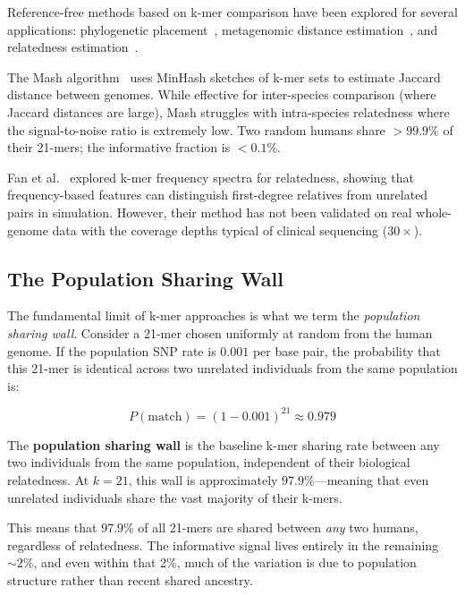 \documentclass{../yalumba}
\begin{document}
Reference-free methods based on k-mer comparison have been explored for
several applications: phylogenetic placement~\cite{brinda2023phylogenetic},
metagenomic distance estimation~\cite{ondov2016mash}, and relatedness
estimation~\cite{fan2021reference}.


The Mash algorithm~\cite{ondov2016mash} uses MinHash sketches of k-mer sets to
estimate Jaccard distance between genomes.  While effective for inter-species
comparison (where Jaccard distances are large), Mash struggles with
intra-species relatedness where the signal-to-noise ratio is extremely low.
Two random humans share $>99.9\%$ of their 21-mers; the informative fraction
is $<0.1\%$.

Fan et al.~\cite{fan2021reference} explored k-mer frequency spectra for
relatedness, showing that frequency-based features can distinguish first-degree
relatives from unrelated pairs in simulation.  However, their method has not
been validated on real whole-genome data with the coverage depths typical of
clinical sequencing ($30\times$).

\subsection{The Population Sharing Wall}
\label{sec:sharing-wall}

The fundamental limit of k-mer approaches is what we term the
\emph{population sharing wall}.  Consider a 21-mer chosen uniformly at random
from the human genome.  If the population SNP rate is $0.001$ per base pair,
the probability that this 21-mer is identical across two unrelated individuals
from the same population is:

\begin{equation}
  P(\text{match}) = (1 - 0.001)^{21} \approx 0.979
  \label{eq:sharing-wall}
\end{equation}

\begin{definition}
The \textbf{population sharing wall} is the baseline k-mer sharing rate between
any two individuals from the same population, independent of their biological
relatedness.  At $k = 21$, this wall is approximately $97.9\%$---meaning that
even unrelated individuals share the vast majority of their k-mers.
\end{definition}

\noindent This means that 97.9\% of all 21-mers are shared between \emph{any}
two humans, regardless of relatedness.  The informative signal lives entirely
in the remaining $\sim2\%$, and even within that 2\%, much of the variation is
due to population structure rather than recent shared ancestry.
\end{document}
